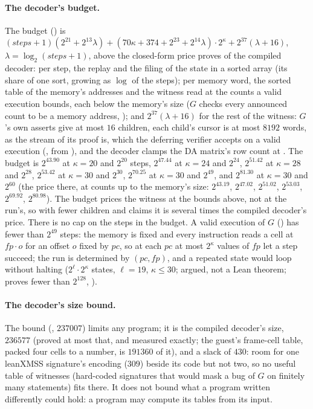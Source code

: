 \documentclass[11pt]{article}
\begin{document}
\paragraph{The decoder's budget.} The budget () is
$(\mathit{steps} + 1)(2^{21} + 2^{13}\lambda) + (70\kappa + 374 + 2^{23} + 2^{14}\lambda)\cdot 2^\kappa + 2^{37}(\lambda + 16)$,
$\lambda = \log_2(\mathit{steps} + 1)$, above the closed-form price  proves of the
compiled decoder: per step, the replay and the filing of the state in a sorted array (its share of
one sort, growing as $\log$ of the steps); per memory word, the sorted table of the memory's
addresses and the witness read at the counts a valid execution bounds, each below the memory's
size ($G$ checks every announced count to be a memory address, ); and
$2^{37}(\lambda + 16)$ for the rest of the witness: $G$'s own asserts give at most $16$ children,
each child's cursor is at most $8192$ words, as the stream of its proof is, which the deferring
verifier accepts on a valid execution (, from
), and the decoder clamps the DA matrix's row count at . The
budget is $2^{43.90}$ at $\kappa = 20$ and $2^{20}$ steps, $2^{47.44}$ at $\kappa = 24$ and
$2^{24}$, $2^{51.42}$ at $\kappa = 28$ and $2^{28}$, $2^{53.42}$ at $\kappa = 30$ and $2^{30}$,
$2^{70.25}$ at $\kappa = 30$ and $2^{49}$, and $2^{81.30}$ at $\kappa = 30$ and $2^{60}$ (the price
there, at counts up to the memory's size: $2^{43.19}$, $2^{47.02}$, $2^{51.02}$, $2^{53.03}$,
$2^{69.92}$, $2^{80.98}$). The budget prices the witness at the bounds above, not at the run's, so
with fewer children and claims it is several times the compiled decoder's price. There is no cap on the steps in the budget. A valid execution of $G$ ()
has fewer than $2^{49}$ steps: the memory is fixed and every instruction reads a cell at
$\mathit{fp}\cdot o$ for an offset $o$ fixed by $\mathit{pc}$, so at each $\mathit{pc}$ at most
$2^\kappa$ values of $\mathit{fp}$ let a step succeed; the run is determined by
$(\mathit{pc}, \mathit{fp})$, and a repeated state would loop without halting
($2^\ell\cdot 2^\kappa$ states, $\ell = 19$, $\kappa \le 30$; argued, not a Lean theorem;
 proves fewer than $2^{128}$, ).

\paragraph{The decoder's size bound.} The bound (, $237007$)
limits any program; it is the compiled decoder's size, $236577$ (proved at most that, and measured
exactly; the guest's frame-cell table, packed four cells to a number, is $191360$ of it), and a slack of
$430$: room for one leanXMSS signature's encoding ($309$) beside its code but not two, so no useful
table of witnesses (hard-coded signatures that would mask a bug of $G$ on finitely many statements)
fits there. It does not bound what a program written differently could hold: a program may compute
its tables from its input.
\end{document}
